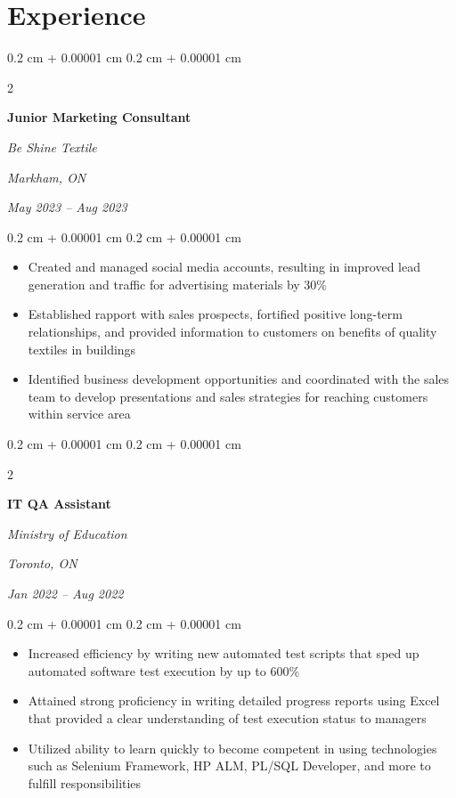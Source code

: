 \documentclass[10pt, letterpaper]{article}
\newenvironment{highlights}{
    \begin{itemize}[
        topsep=0.10 cm,
        parsep=0.10 cm,
        partopsep=0pt,
        itemsep=0pt,
        leftmargin=0.4 cm + 10pt
    ]
}{
    \end{itemize}
} %
\newenvironment{onecolentry}{
    \begin{adjustwidth}{
        0.2 cm + 0.00001 cm
    }{
        0.2 cm + 0.00001 cm
    }
}{
    \end{adjustwidth}
} %
\newenvironment{twocolentry}[2][]{
    \onecolentry
    \def\secondColumn{#2}
    \setcolumnwidth{\fill, 4.5 cm}
    \begin{paracol}{2}
}{
    \switchcolumn \raggedleft \secondColumn
    \end{paracol}
    \endonecolentry
} %
\begin{document}
    
    \section{Experience}



        
        \begin{twocolentry}{
        \textit{Markham, ON}    
            
        \textit{May 2023 – Aug 2023}}
            \textbf{Junior Marketing Consultant}
            
            \textit{Be Shine Textile}
        \end{twocolentry}

        \vspace{0.10 cm}
        \begin{onecolentry}
            \begin{highlights}
                \item Created and managed social media accounts, resulting in improved lead generation and traffic for advertising materials by 30\%
                \item Established rapport with sales prospects, fortified positive long-term relationships, and provided information to customers on benefits of quality textiles in buildings
                \item Identified business development opportunities and coordinated with the sales team to develop presentations and sales strategies for reaching customers within service area
            \end{highlights}
        \end{onecolentry}


        \vspace{0.2 cm}

        \begin{twocolentry}{
        \textit{Toronto, ON}    
            
        \textit{Jan 2022 – Aug 2022}}
            \textbf{IT QA Assistant}
            
            \textit{Ministry of Education}
        \end{twocolentry}

        \vspace{0.10 cm}
        \begin{onecolentry}
            \begin{highlights}
                \item Increased efficiency by writing new automated test scripts that sped up automated software test execution by up to 600\%
                \item Attained strong proficiency in writing detailed progress reports using Excel that provided a clear understanding of test execution status to managers
                \item Utilized ability to learn quickly to become competent in using technologies such as Selenium Framework, HP ALM, PL/SQL Developer, and more to fulfill responsibilities
            \end{highlights}
        \end{onecolentry}
\end{document}
